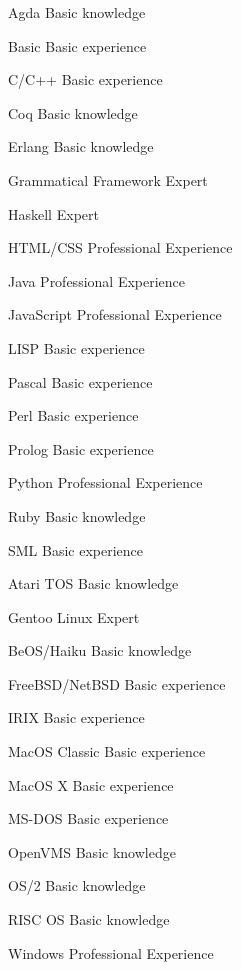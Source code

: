\documentclass[11pt, a4]{academic-cv}
\begin{document}
\begin{cvskills}
\cvskill
{}
{Agda}
{Basic knowledge}

\cvskill
{}
{Basic}
{Basic experience}

\cvskill
{}
{C/C++}
{Basic experience}

\cvskill
{}
{Coq}
{Basic knowledge}

\cvskill
{}
{Erlang}
{Basic knowledge}

\cvskill
{}
{Grammatical Framework}
{Expert}

\cvskill
{}
{Haskell}
{Expert}

\cvskill
{}
{HTML/CSS}
{Professional Experience}

\cvskill
{}
{Java}
{Professional Experience}

\cvskill
{}
{JavaScript}
{Professional Experience}

\cvskill
{}
{LISP}
{Basic experience}

\cvskill
{}
{Pascal}
{Basic experience}

\cvskill
{}
{Perl}
{Basic experience}

\cvskill
{}
{Prolog}
{Basic experience}

\cvskill
{}
{Python}
{Professional Experience}

\cvskill
{}
{Ruby}
{Basic knowledge}

\cvskill
{}
{SML}
{Basic experience}

\end{cvskills}

\begin{cvskills}
\cvskill
{}
{Atari TOS}
{Basic knowledge}

\cvskill
{}
{Gentoo Linux}
{Expert}

\cvskill
{}
{BeOS/Haiku}
{Basic knowledge}

\cvskill
{}
{FreeBSD/NetBSD}
{Basic experience}

\cvskill
{}
{IRIX}
{Basic experience}

\cvskill
{}
{MacOS Classic}
{Basic experience}

\cvskill
{}
{MacOS X}
{Basic experience}

\cvskill
{}
{MS-DOS}
{Basic experience}

\cvskill
{}
{OpenVMS}
{Basic knowledge}

\cvskill
{}
{OS/2}
{Basic knowledge}

\cvskill
{}
{RISC OS}
{Basic knowledge}

\cvskill
{}
{Windows}
{Professional Experience}

\end{cvskills}
\end{document}
